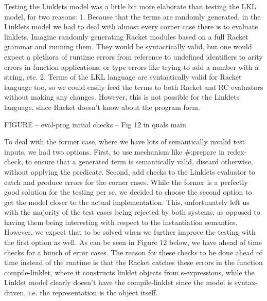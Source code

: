 			\begin{paragraph-here}%
				Testing the Linklets model was a little bit more elaborate than testing the LKL model, for two reasons: 1. Because that the terms are randomly generated, in the Linklets model we had to deal with almost every corner case there is to evaluate linklets. Imagine randomly generating Racket modules based on a full Racket grammar and running them. They would be syntactically valid, but one would expect a plethora of runtime errors from reference to undefined identifiers to arity errors in function applications, or type errors like trying to add a number with a string, etc. 2. Terms of the LKL language are syntactically valid for Racket language too, so we could easily feed the terms to both Racket and RC evaluators without making any changes. However, this is not possible for the Linklets language, since Racket doesn’t know about the program form.
			\end{paragraph-here}

			\begin{figure-here}
				FIGURE -- eval-prog initial checks -- Fig 12 in quals main
			\end{figure-here}

			\begin{paragraph-here}%
				To deal with the former case, where we have lots of semantically invalid test inputs, we had two options. First, to use mechanism like \#:prepare in redex-check, to ensure that a generated term is semantically valid, discard otherwise, without applying the predicate. Second, add checks to the Linklets evaluator to catch and produce errors for the corner cases. While the former is a perfectly good solution for the testing per se, we decided to choose the second option to get the model closer to the actual implementation. This, unfortunately left us with the majority of the test cases being rejected by both systems, as opposed to having them being interesting with respect to the instantiation semantics. However, we expect that to be solved when we further improve the testing with the first option as well. As can be seen in Figure 12 below, we have ahead of time checks for a bunch of error cases. The reason for these checks to be done ahead of time instead of the runtime is that the Racket catches these errors in the function compile-linklet, where it constructs linklet objects from s-expressions, while the Linklet model clearly doesn’t have the compile-linklet since the model is syntax-driven, i.e. the representation is the object itself.
			\end{paragraph-here}

